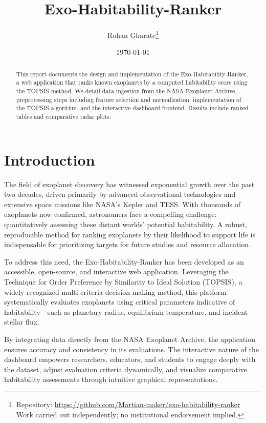 \documentclass[12pt]{article}
\title{Exo-Habitability-Ranker}
\author{Rohan Gharate\thanks{Repository: \url{https://github.com/Martian-maker/exo-habitability-ranker}\\[0.3em] Work carried out independently; no institutional endorsement implied.}}
\date{\today}
\begin{document}
\maketitle
\thispagestyle{empty}

\newpage

\begin{abstract}
This report documents the design and implementation of the Exo-Habitability-Ranker, a web application that ranks known exoplanets by a computed habitability score using the TOPSIS method. We detail data ingestion from the NASA Exoplanet Archive, preprocessing steps including feature selection and normalization, implementation of the TOPSIS algorithm, and the interactive dashboard frontend. Results include ranked tables and comparative radar plots. \end{abstract}

\newpage
\tableofcontents
\newpage

\section{Introduction}\label{sec:intro}

The field of exoplanet discovery has witnessed exponential growth over the past two decades, driven primarily by advanced observational technologies and extensive space missions like NASA's Kepler and TESS. With thousands of exoplanets now confirmed, astronomers face a compelling challenge: quantitatively assessing these distant worlds' potential habitability. A robust, reproducible method for ranking exoplanets by their likelihood to support life is indispensable for prioritizing targets for future studies and resource allocation.

To address this need, the Exo-Habitability-Ranker has been developed as an accessible, open-source, and interactive web application. Leveraging the Technique for Order Preference by Similarity to Ideal Solution (TOPSIS), a widely recognized multi-criteria decision-making method, this platform systematically evaluates exoplanets using critical parameters indicative of habitability—such as planetary radius, equilibrium temperature, and incident stellar flux.

By integrating data directly from the NASA Exoplanet Archive, the application ensures accuracy and consistency in its evaluations. The interactive nature of the dashboard empowers researchers, educators, and students to engage deeply with the dataset, adjust evaluation criteria dynamically, and visualize comparative habitability assessments through intuitive graphical representations.
\end{document}
